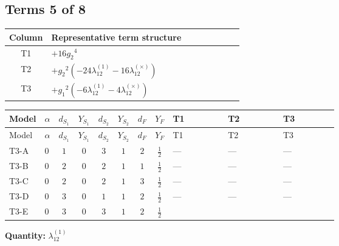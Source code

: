 \documentclass[8pt]{article}
\begin{document}
\begin{landscape}
\subsection*{Terms 5 of 8}
\begin{center}
\begin{tabular}{@{}c >{\raggedright\arraybackslash}p{0.82\linewidth}@{}}
\toprule
Column & Representative term structure \\
\midrule
T1 & \(\displaystyle +16 {g_2}^4\) \\
\midrule
T2 & \(\displaystyle +{g_2}^2 (-24 {\lambda_{12}^{(1)}}-16 {\lambda_{12}^{(\times)}})\) \\
\midrule
T3 & \(\displaystyle +{g_1}^2 (-6 {\lambda_{12}^{(1)}}-4 {\lambda_{12}^{(\times)}})\) \\
\midrule
\bottomrule
\end{tabular}
\end{center}
\smallskip
\tiny
\begin{longtable}{@{}llcccccc >{\raggedright\arraybackslash}p{0.21\linewidth} >{\raggedright\arraybackslash}p{0.21\linewidth} >{\raggedright\arraybackslash}p{0.21\linewidth}@{}}
\toprule
Model & $\alpha$ & $d_{S_1}$ & $Y_{S_1}$ & $d_{S_2}$ & $Y_{S_2}$ & $d_F$ & $Y_F$ & T1 & T2 & T3 \\
\midrule
\endfirsthead
\toprule
Model & $\alpha$ & $d_{S_1}$ & $Y_{S_1}$ & $d_{S_2}$ & $Y_{S_2}$ & $d_F$ & $Y_F$ & T1 & T2 & T3 \\
\midrule
\endhead
T3-A & $0$ & $1$ & $0$ & $3$ & $1$ & $2$ & $\frac{1}{2}$ & --- & --- & --- \\
\midrule
T3-B & $0$ & $2$ & $0$ & $2$ & $1$ & $1$ & $\frac{1}{2}$ & --- & --- & --- \\
\midrule
T3-C & $0$ & $2$ & $0$ & $2$ & $1$ & $3$ & $\frac{1}{2}$ & --- & --- & --- \\
\midrule
T3-D & $0$ & $3$ & $0$ & $1$ & $1$ & $2$ & $\frac{1}{2}$ & --- & --- & --- \\
\midrule
T3-E & $0$ & $3$ & $0$ & $3$ & $1$ & $2$ & $\frac{1}{2}$ & \scriptsize\adjustbox{max width=\linewidth}{$\begin{gathered} +16 {g_2}^4\end{gathered}$} & \scriptsize\adjustbox{max width=\linewidth}{$\begin{gathered} +{g_2}^2 (-24 {\lambda_{12}^{(1)}}-16 {\lambda_{12}^{(\times)}})\end{gathered}$} & \scriptsize\adjustbox{max width=\linewidth}{$\begin{gathered} +{g_1}^2 (-6 {\lambda_{12}^{(1)}}-4 {\lambda_{12}^{(\times)}})\end{gathered}$} \\
\midrule
\bottomrule
\end{longtable}
\clearpage
\noindent\textbf{Quantity: }$\lambda_{12}^{(1)}$\par\smallskip

\end{landscape}
\end{document}
